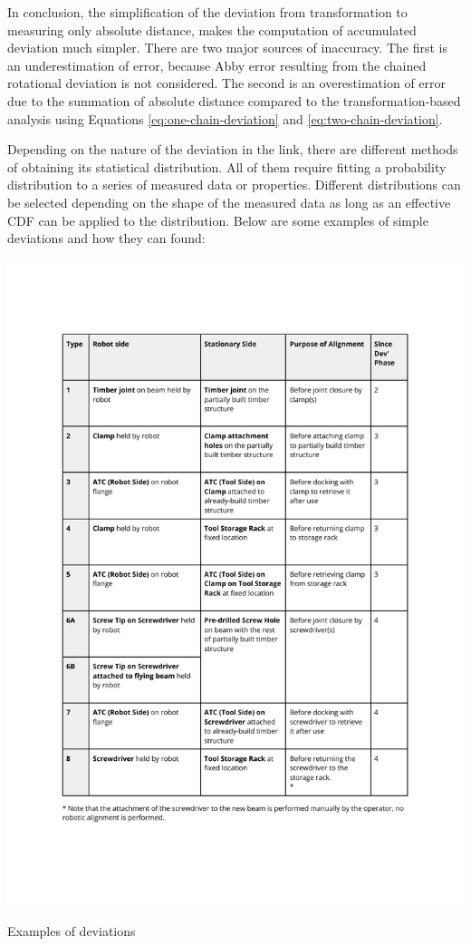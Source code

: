 In conclusion, the simplification of the deviation from transformation to measuring only absolute distance, makes the computation of accumulated deviation much simpler. There are two major sources of inaccuracy. The first is an underestimation of error, because Abby error resulting from the chained rotational deviation is not considered. The second is an overestimation of error due to the summation of absolute distance compared to the transformation-based analysis using Equations \ref{eq:one-chain-deviation} and \ref{eq:two-chain-deviation}.



Depending on the nature of the deviation in the link, there are different methods of obtaining its statistical distribution. All of them require fitting a probability distribution to a series of measured data or properties. Different distributions can be selected depending on the shape of the measured data as long as an effective CDF can be applied to the distribution. Below are some examples of simple deviations and how they can found:

\begin{table}
    \includegraphics[page=2, trim=25.4mm 130mm 25.4mm 33mm, clip, width=\textwidth]{tables/Tables in Chapter 9 to 11.pdf}
    \caption{Examples of deviations}
\end{table}

